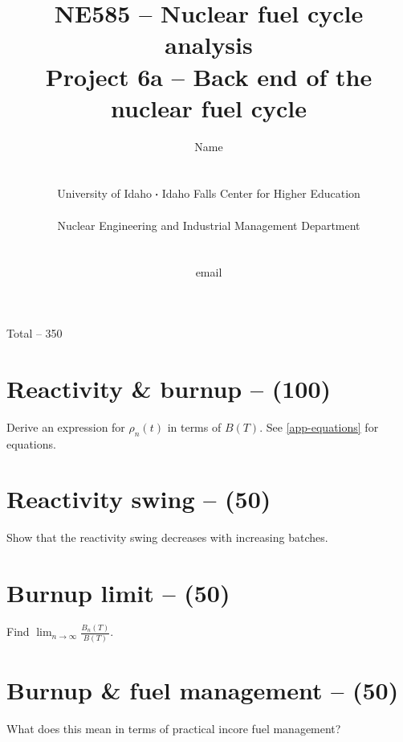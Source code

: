 \documentclass[11pt,a4paper]{article}
\newcommand*\sq{\mathbin{\vcenter{\hbox{\rule{.3ex}{.3ex}}}}} %
\begin{document}
\begin{titlepage}
    \title{
        NE585 -- Nuclear fuel cycle analysis\\
        Project 6a -- Back end of the nuclear fuel cycle\\
    }
    \author{
        Name
        \\ \\ \\
        University of Idaho $\sq$ Idaho Falls Center for Higher Education
        \\ \\
        Nuclear Engineering and Industrial Management Department
        \\ \\ \\
        email 
    }
\clearpage %
\maketitle
\vspace*{\fill}
\begin{flushright}{
        Total -- 350
}
\end{flushright}
\thispagestyle{empty} %
\end{titlepage}


\section{Reactivity \& burnup -- (100)}
Derive an expression for $\rho_n(t)$ in terms of $B(T)$. See \cref{app-equations} for equations.




\newpage

\section{Reactivity swing -- (50)}
Show that the reactivity swing decreases with increasing batches.




\newpage

\section{Burnup limit -- (50)}
Find $\lim_{n \rightarrow \infty} \frac{B_n(T)}{B(T)}$.




\newpage

\section{Burnup \& fuel management -- (50)}
What does this mean in terms of practical incore fuel management?
\end{document}
